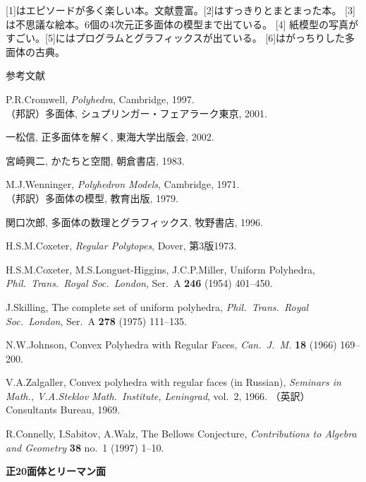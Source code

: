 \documentclass[uplatex,dvipdfmx]{jlreq}
\begin{document}
[1]はエピソードが多く楽しい本。文献豊富。[2]はすっきりとまとまった本。
[3]は不思議な絵本。6個の4次元正多面体の模型まで出ている。
[4] 紙模型の写真がすごい。[5]にはプログラムとグラフィックスが出ている。
[6]はがっちりした多面体の古典。

\begin{center}\textsc{参考文献}\end{center}
\begin{enumerate}[{[1]}]
  \item P.R.Cromwell, \textit{Polyhedra}, Cambridge, 1997.\\
    （邦訳）多面体, シュプリンガー・フェアラーク東京, 2001.
  \item 一松信, 正多面体を解く, 東海大学出版会, 2002.
  \item 宮崎興二, かたちと空間, 朝倉書店, 1983.
  \item M.J.Wenninger, \textit{Polyhedron Models}, Cambridge, 1971.\\
    （邦訳）多面体の模型, 教育出版, 1979.
  \item 関口次郎, 多面体の数理とグラフィックス, 牧野書店, 1996.
  \item H.S.M.Coxeter, \textit{Regular Polytopes}, Dover, 第3版1973.
  \item H.S.M.Coxeter, M.S.Longuet-Higgins, J.C.P.Miller,
    Uniform Polyhedra,
    \textit{Phil.\ Trans.\ Royal Soc.\ London}, Ser.~A \textbf{246} (1954) 401--450.
  \item J.Skilling, The complete set of uniform polyhedra,
    \textit{Phil.\ Trans.\ Royal Soc.\ London}, Ser.~A \textbf{278} (1975) 111--135.
  \item N.W.Johnson, Convex Polyhedra with Regular Faces,
    \textit{Can.\ J.\ M.} \textbf{18} (1966) 169--200.
  \item V.A.Zalgaller, Convex polyhedra with regular faces (in Russian),
    \textit{Seminars in Math., V.A.Steklov Math.\ Institute, Leningrad}, vol.~2, 1966.
    （英訳）Consultants Bureau, 1969.
  \item R.Connelly, I.Sabitov, A.Walz, The Bellows Conjecture,
    \textit{Contributions to Algebra and Geometry} \textbf{38} no.~1 (1997) 1--10.
\end{enumerate}

\newpage

\begin{center}
{\large\bfseries 正20面体とリーマン面}\\[6pt]
\hspace*{\fill}{\large\bfseries 加藤 文元（京大・理）}
\end{center}
\end{document}
